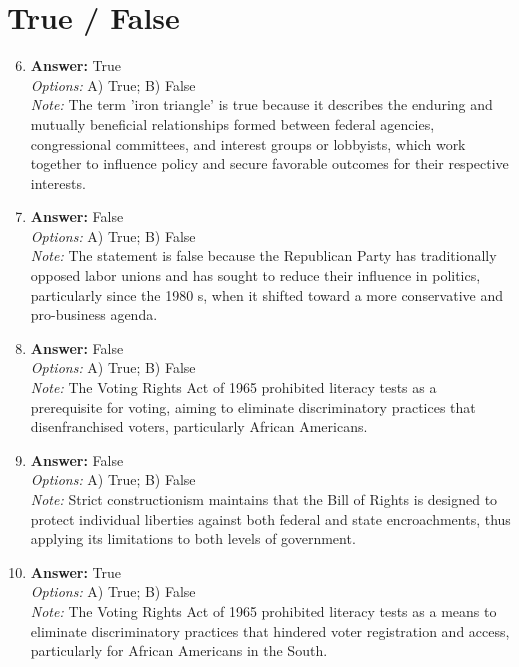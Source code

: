 \documentclass[12pt]{article}
\begin{document}
\section*{True / False}
\begin{enumerate}[label=\arabic*.]
\setcounter{enumi}{5}
\item \textbf{Answer:} True
\\ \textit{Options:} A) True; B) False
\\ \textit{Note:} The term 'iron triangle' is true because it describes the enduring and mutually beneficial relationships formed between federal agencies, congressional committees, and interest groups or lobbyists, which work together to influence policy and secure favorable outcomes for their respective interests.
\item \textbf{Answer:} False
\\ \textit{Options:} A) True; B) False
\\ \textit{Note:} The statement is false because the Republican Party has traditionally opposed labor unions and has sought to reduce their influence in politics, particularly since the 1980 s, when it shifted toward a more conservative and pro-business agenda.
\item \textbf{Answer:} False
\\ \textit{Options:} A) True; B) False
\\ \textit{Note:} The Voting Rights Act of 1965 prohibited literacy tests as a prerequisite for voting, aiming to eliminate discriminatory practices that disenfranchised voters, particularly African Americans.
\item \textbf{Answer:} False
\\ \textit{Options:} A) True; B) False
\\ \textit{Note:} Strict constructionism maintains that the Bill of Rights is designed to protect individual liberties against both federal and state encroachments, thus applying its limitations to both levels of government.
\item \textbf{Answer:} True
\\ \textit{Options:} A) True; B) False
\\ \textit{Note:} The Voting Rights Act of 1965 prohibited literacy tests as a means to eliminate discriminatory practices that hindered voter registration and access, particularly for African Americans in the South.
\end{enumerate}
\end{document}
